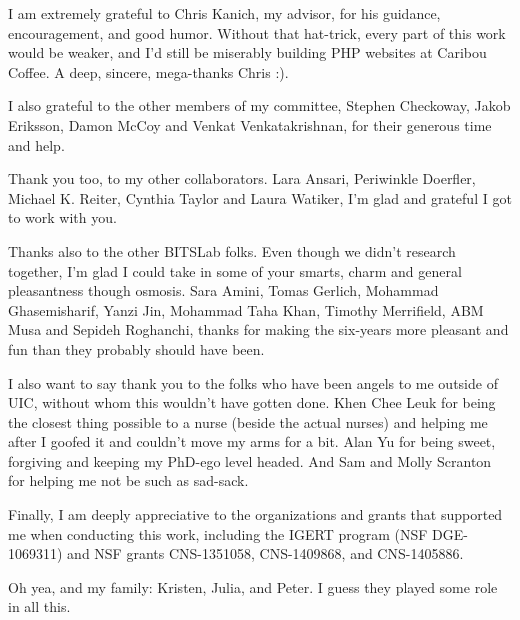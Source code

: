 \acknowledgment
I am extremely grateful to Chris Kanich, my advisor, for his guidance,
encouragement, and good humor.  Without that hat-trick, every part of this
work would be weaker, and I'd still be miserably building PHP websites
at Caribou Coffee.  A deep, sincere, mega-thanks Chris :).

I also grateful to the other members of my committee, Stephen Checkoway,
Jakob Eriksson, Damon McCoy and Venkat Venkatakrishnan, for their generous
time and help.

Thank you too, to my other collaborators. Lara Ansari,
Periwinkle Doerfler, Michael K. Reiter, Cynthia Taylor and Laura Watiker,
I'm glad and grateful I got to work with you.

Thanks also to the other BITSLab folks.  Even though we didn't research
together, I'm glad I could take in some of your smarts, charm and general
pleasantness though osmosis. Sara Amini, Tomas Gerlich, Mohammad Ghasemisharif,
Yanzi Jin, Mohammad Taha Khan, Timothy Merrifield, ABM Musa and Sepideh
Roghanchi, thanks for making the six-years more pleasant and fun than they
probably should have been.

I also want to say thank you to the folks who have been angels to me outside of
UIC, without whom this wouldn't have gotten done. Khen Chee Leuk for being the
closest thing possible to a nurse (beside the actual nurses) and helping me
after I goofed it and couldn't move my arms for a bit.  Alan Yu for being
sweet, forgiving and keeping my PhD-ego level headed.  And Sam and Molly
Scranton for helping me not be such as sad-sack.

Finally, I am deeply appreciative to the organizations and grants that
supported me when conducting this work, including the IGERT program (NSF
DGE-1069311) and NSF grants CNS-1351058, CNS-1409868, and CNS-1405886.

Oh yea, and my family: Kristen, Julia, and Peter.  I guess they played some
role in all this.
